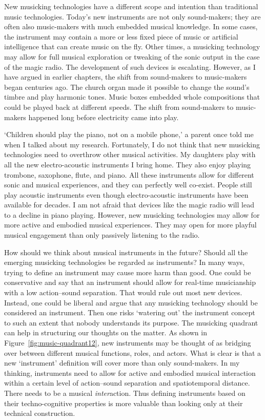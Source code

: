 New musicking technologies have a different scope and intention than traditional music technologies. Today's new instruments are not only sound-makers; they are often also music-makers with much embedded musical knowledge. In some cases, the instrument may contain a more or less fixed piece of music or artificial intelligence that can create music on the fly. Other times, a musicking technology may allow for full musical exploration or tweaking of the sonic output in the case of the magic radio. The development of such devices is escalating. However, as I have argued in earlier chapters, the shift from sound-makers to music-makers began centuries ago. The church organ made it possible to change the sound's timbre and play harmonic tones. Music boxes embedded whole compositions that could be played back at different speeds. The shift from sound-makers to music-makers happened long before electricity came into play.

`Children should play the piano, not on a mobile phone,' a parent once told me when I talked about my research. Fortunately, I do not think that new musicking technologies need to overthrow other musical activities. My daughters play with all the new electro-acoustic instruments I bring home. They also enjoy playing trombone, saxophone, flute, and piano. All these instruments allow for different sonic and musical experiences, and they can perfectly well co-exist. People still play acoustic instruments even though electro-acoustic instruments have been available for decades. I am not afraid that devices like the magic radio will lead to a decline in piano playing. However, new musicking technologies may allow for more active and embodied musical experiences. They may open for more playful musical engagement than only passively listening to the radio.

How should we think about musical instruments in the future? Should all the emerging musicking technologies be regarded as instruments? In many ways, trying to define an instrument may cause more harm than good. One could be conservative and say that an instrument should allow for real-time musicianship with a low action--sound separation. That would rule out most new devices. Instead, one could be liberal and argue that any musicking technology should be considered an instrument. Then one risks `watering out' the instrument concept to such an extent that nobody understands its purpose. The musicking quadrant can help in structuring our thoughts on the matter. As shown in Figure~\ref{fig:music-quadrant12}, new instruments may be thought of as bridging over between different musical functions, roles, and actors. What is clear is that a new `instrument' definition will cover more than only sound-makers. In my thinking, instruments need to allow for active and embodied musical interaction within a certain level of action--sound separation and spatiotemporal distance. There needs to be a musical \emph{inter}action. Thus defining instruments based on their techno-cognitive properties is more valuable than looking only at their technical construction.


